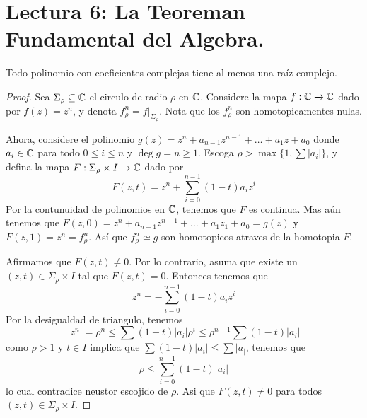 \section*{Lectura 6: La Teoreman Fundamental del Algebra.}

\begin{theorem}\label{thm_6.11}
    Todo polinomio con coeficientes complejas tiene al menos una ra\'iz
    complejo.
\end{theorem}
\begin{proof}
    Sea $\Sigma_\rho \subseteq \mathbb{C}$ el circulo de radio  $\rho$ en  $\mathbb{C}$.
    Considere la mapa  $f:\mathbb{C} \xrightarrow{} \mathbb{C}$ dado por $f(z)=z^n$, y denota
    $f^n_\rho=f|_{\Sigma_\rho}$. Nota que los $f^n_\rho$ son homotopicamentes
    nulas.

    Ahora, considere el polinomio  $g(z)=z^n+a_{n-1}z^{n-1}+\dots+a_1z+a_0$
    donde $a_i \in \mathbb{C}$ para todo  $0 \leq i \leq n$ y  $\deg{g}=n \geq 1$.
    Escoga $\rho>\max{\{1,\sum{|a_i|}\}}$, y defina la mapa $F:\Sigma_\rho
    \times I \xrightarrow{} \mathbb{C}$ dado por
    \begin{equation*}
        F(z,t)=z^n+\sum_{i=0}^{n-1}{(1-t)a_iz^i}
    \end{equation*}
    Por la contunuidad de polinomios en $\mathbb{C}$, tenemos que  $F$ es continua. Mas
    a\'un tenemos que  $F(z,0)=z^n+a_{n-1}z^{n-1}+\dots+a_1z_1+a_0=g(z)$ y
    $F(z,1)=z^n=f^n_\rho$. As\'i que $f^n_\rho \simeq g$ son homotopicos atraves
    de la homotopia $F$.

    Afirmamos que $F(z,t) \neq 0$. Por lo contrario, asuma que existe un $(z,t)
    \in \Sigma_\rho \times I$ tal que $F(z,t)=0$. Entonces tenemos que
    \begin{equation*}
        z^n=-\sum_{i=0}^{n-1}{(1-t)a_iz^i}
    \end{equation*}
    Por la desigualdad de triangulo, tenemos
    \begin{equation*}
        |z^n|=\rho^n \leq \sum{(1-t)|a_i|\rho^i} \leq \rho^{n-1}\sum{(1-t)|a_i|}
    \end{equation*}
    como $\rho>1$ y  $t \in I$ implica que  $\sum{(1-t)|a_i|} \leq \sum{|a_|}$,
    tenemos que
    \begin{equation*}
        \rho \leq \sum_{i=0}^{n-1}{(1-t)|a_i|}
    \end{equation*}
    lo cual contradice neustor escojido de $\rho$. Asi que  $F(z,t) \neq 0$ para
    todos $(z,t) \in \Sigma_\rho \times I$.


\end{proof}
